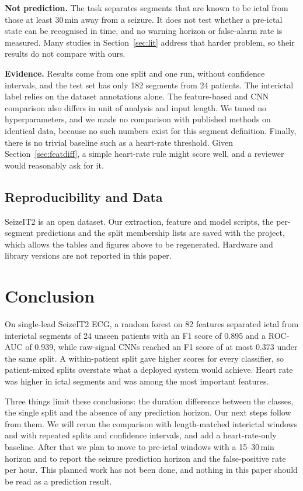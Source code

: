 \documentclass[conference,a4paper]{IEEEtran}
\begin{document}
\textbf{Not prediction.} The task separates segments that are known to be
ictal from those at least 30\,min away from a seizure. It does not test
whether a pre-ictal state can be recognised in time, and no warning horizon
or false-alarm rate is measured. Many studies in Section~\ref{sec:lit}
address that harder problem, so their results do not compare with ours.

\textbf{Evidence.} Results come from one split and one run, without
confidence intervals, and the test set has only 182 segments from 24
patients. The interictal label relies on the dataset annotations alone. The
feature-based and CNN comparison also differs in unit of analysis and input
length. We tuned no hyperparameters, and we made no comparison with
published methods on identical data, because no such numbers exist for this
segment definition. Finally, there is no trivial baseline such as a
heart-rate threshold. Given Section~\ref{sec:featdiff}, a simple heart-rate
rule might score well, and a reviewer would reasonably ask for it.

\subsection{Reproducibility and Data}
SeizeIT2 is an open dataset. Our extraction, feature and model scripts, the
per-segment predictions and the split membership lists are saved with the
project, which allows the tables and figures above to be regenerated.
Hardware and library versions are not reported in this paper.

\section{Conclusion}
On single-lead SeizeIT2 ECG, a random forest on 82 features separated ictal
from interictal segments of 24 unseen patients with an F1 score of 0.895 and
a ROC-AUC of 0.939, while raw-signal CNNs reached an F1 score of at most
0.373 under the same split. A within-patient split gave higher scores for
every classifier, so patient-mixed splits overstate what a deployed system
would achieve. Heart rate was higher in ictal segments and was among the
most important features.

Three things limit these conclusions: the duration difference between the
classes, the single split and the absence of any prediction horizon. Our
next steps follow from them. We will rerun the comparison with
length-matched interictal windows and with repeated splits and confidence
intervals, and add a heart-rate-only baseline. After that we plan to move to
pre-ictal windows with a 15--30\,min horizon and to report the seizure
prediction horizon and the false-positive rate per hour. This planned work
has not been done, and nothing in this paper should be read as a prediction
result.
\end{document}

